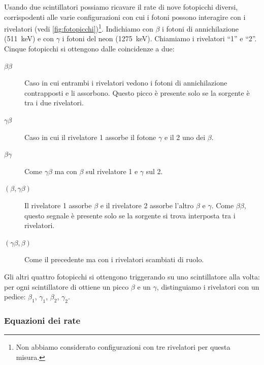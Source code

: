 Usando due scintillatori possiamo ricavare il rate di nove fotopicchi diversi,
corrispodenti alle varie configurazioni con cui i fotoni possono interagire con i rivelatori
(vedi \autoref{fig:fotopicchi})\footnote{Non abbiamo considerato configurazioni con tre rivelatori per questa misura.}.
Indichiamo con $\beta$ i fotoni di annichilazione (\SI{511}{keV})
e con $\gamma$ i fotoni del neon (\SI{1275}{keV}).
Chiamiamo i rivelatori ``1'' e ``2''.
Cinque fotopicchi si ottengono dalle coincidenze a due:
\begin{description}
	\item[$\beta\beta$]
	Caso in cui entrambi i rivelatori vedono i fotoni di annichilazione contrapposti e li assorbono.
	Questo picco è presente solo se la sorgente è tra i due rivelatori.
	\item[$\gamma\beta$]
	Caso in cui il rivelatore 1 assorbe il fotone $\gamma$ e il 2 uno dei $\beta$.
	\item[$\beta\gamma$]
	Come $\gamma\beta$ ma con $\beta$ sul rivelatore 1 e $\gamma$ sul 2.
	\item[$(\beta,\gamma\beta)$]
	Il rivelatore 1 assorbe $\beta$ e il rivelatore 2 assorbe l'altro $\beta$ e $\gamma$.
	Come $\beta\beta$, questo segnale è presente solo se la sorgente si trova interposta tra i rivelatori.
	\item[$(\gamma\beta,\beta)$]
	Come il precedente ma con i rivelatori scambiati di ruolo.
\end{description}
Gli altri quattro fotopicchi si ottengono triggerando su uno scintillatore alla volta:
per ogni scintillatore di ottiene un picco $\beta$ e un $\gamma$,
distinguiamo i rivelatori con un pedice: $\beta_1$, $\gamma_1$, $\beta_2$, $\gamma_2$.

\subsubsection{Equazioni dei rate}

